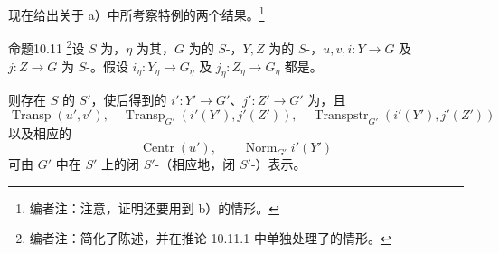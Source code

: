 现在给出关于 a）中所考察特例的两个结果。\footnote{编者注：注意，证明还要用到 b）的情形。}
\begin{SGAresult}{命题}{10.11}
\footnote{编者注：简化了陈述，并在推论 10.11.1 中单独处理了的情形。}设 $S$ 为，$\eta$ 为其，$G$ 为的 $S$-，$Y,Z$ 为的 $S$-，$u,v,i:Y\to G$ 及 $j:Z\to G$ 为 $S$-。假设 $i_\eta:Y_\eta\to G_\eta$ 及 $j_\eta:Z_\eta\to G_\eta$ 都是。

则存在 $S$ 的 $S'$，使后得到的 $i':Y'\to G'$、$j':Z'\to G'$ 为，且
\[
\operatorname{Transp}(u',v'),\quad
\operatorname{Transp}_{G'}(i'(Y'),j'(Z')),\quad
\operatorname{Transpstr}_{G'}(i'(Y'),j'(Z'))
\]
以及相应的
\[
\operatorname{Centr}(u'),\qquad\operatorname{Norm}_{G'}i'(Y')
\]
可由 $G'$ 中在 $S'$ 上的闭 $S'$-（相应地，闭 $S'$-）表示。
\end{SGAresult}
